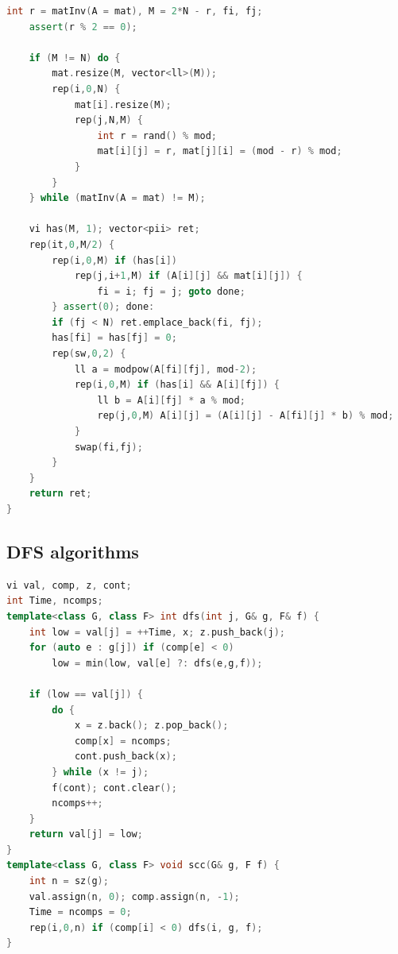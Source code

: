 \begin{multicols}{\Columns}
\begin{lstlisting}[language=C++]
	int r = matInv(A = mat), M = 2*N - r, fi, fj;
	assert(r % 2 == 0);

	if (M != N) do {
		mat.resize(M, vector<ll>(M));
		rep(i,0,N) {
			mat[i].resize(M);
			rep(j,N,M) {
				int r = rand() % mod;
				mat[i][j] = r, mat[j][i] = (mod - r) % mod;
			}
		}
	} while (matInv(A = mat) != M);

	vi has(M, 1); vector<pii> ret;
	rep(it,0,M/2) {
		rep(i,0,M) if (has[i])
			rep(j,i+1,M) if (A[i][j] && mat[i][j]) {
				fi = i; fj = j; goto done;
		} assert(0); done:
		if (fj < N) ret.emplace_back(fi, fj);
		has[fi] = has[fj] = 0;
		rep(sw,0,2) {
			ll a = modpow(A[fi][fj], mod-2);
			rep(i,0,M) if (has[i] && A[i][fj]) {
				ll b = A[i][fj] * a % mod;
				rep(j,0,M) A[i][j] = (A[i][j] - A[fi][j] * b) % mod;
			}
			swap(fi,fj);
		}
	}
	return ret;
}
\end{lstlisting}


\subsection{DFS algorithms}
\begin{lstlisting}[language=C++]
vi val, comp, z, cont;
int Time, ncomps;
template<class G, class F> int dfs(int j, G& g, F& f) {
	int low = val[j] = ++Time, x; z.push_back(j);
	for (auto e : g[j]) if (comp[e] < 0)
		low = min(low, val[e] ?: dfs(e,g,f));

	if (low == val[j]) {
		do {
			x = z.back(); z.pop_back();
			comp[x] = ncomps;
			cont.push_back(x);
		} while (x != j);
		f(cont); cont.clear();
		ncomps++;
	}
	return val[j] = low;
}
template<class G, class F> void scc(G& g, F f) {
	int n = sz(g);
	val.assign(n, 0); comp.assign(n, -1);
	Time = ncomps = 0;
	rep(i,0,n) if (comp[i] < 0) dfs(i, g, f);
}
\end{lstlisting}


\end{multicols}
